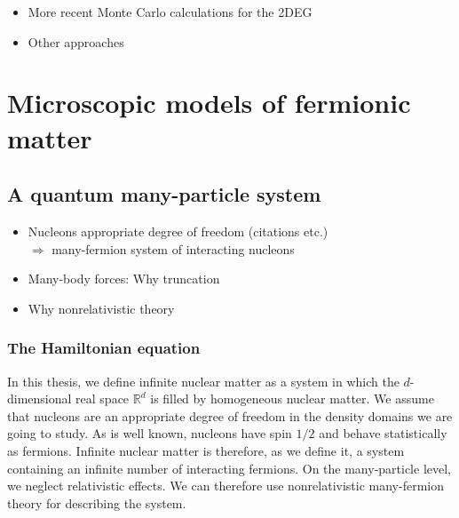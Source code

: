 \documentclass[a4paper,12pt]{report}
\begin{document}
\begin{itemize}
\item More recent Monte Carlo calculations for the 2DEG
\item Other approaches
\end{itemize}


 


\chapter{Microscopic models of fermionic matter}

\section{A quantum many-particle system}

\begin{itemize}
\item Nucleons appropriate degree of freedom (citations etc.) \\
  $\Rightarrow $ many-fermion system of interacting nucleons
\item Many-body forces: Why truncation
\item Why nonrelativistic theory
\end{itemize}

\subsection{The Hamiltonian equation}
In this thesis, we define infinite nuclear matter as a system in which the $d$-dimensional real space $\mathbb{R}^{d}$ is filled by homogeneous nuclear matter. We assume that nucleons are an appropriate degree of freedom in the density domains we are going to study. As is well known, nucleons have spin $1/2$ and behave statistically as fermions. Infinite nuclear matter is therefore, as we define it, a system containing an infinite number of interacting fermions. On the many-particle level, we neglect relativistic effects. We can therefore use nonrelativistic many-fermion theory \cite{fetter,harris,bartlett_book} for describing the system. 
\end{document}
